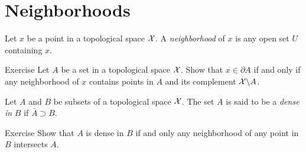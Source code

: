 \section{Neighborhoods}

Let $x$ be a point in a topological space $\mathcal{X}$.
A \emph{neighborhood} of $x$ is any open set $U$ containing $x$.


\begin{thm}{Exercise}
Let $A$ be a set in a topological space $\mathcal{X}$.
Show that $x\in \partial A$ if and only if any neighborhood of $x$ contains points in $A$ and its complement $\mathcal{X}\backslash A$. 
\end{thm}

Let $A$ and $B$ be subsets of a topological space $\mathcal{X}$.
The set $A$ is said to be a \emph{dense in}  $B$ if $\bar A\supset B$.

\begin{thm}{Exercise} Show that $A$ is dense in $B$ if and only any neighborhood of any point in $B$ intersects $A$.
\end{thm}


